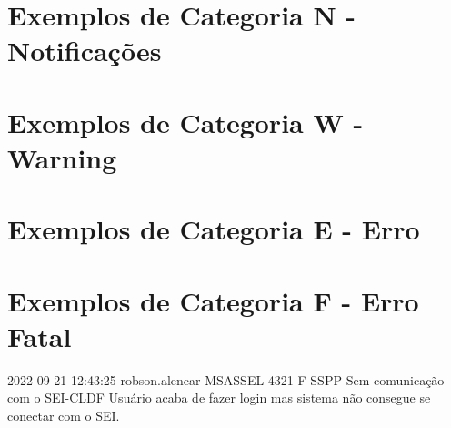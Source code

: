 \section{Exemplos de Categoria N - Notificações}

\section{Exemplos de Categoria W - Warning}

\section{Exemplos de Categoria E - Erro}

\section{Exemplos de Categoria F - Erro Fatal}

{2022-09-21 12:43:25}
{robson.alencar}
{MSASSEL-4321}
{F}
{SSPP}
{Sem comunicação com o SEI-CLDF}
{Usuário acaba de fazer login mas sistema não consegue se conectar com o SEI.}




